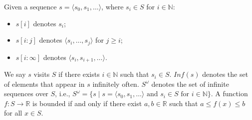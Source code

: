 Given a sequence \( s = \langle s_0, s_1, \dots \rangle \), where $s_i \in S$ for $i \in \mathbb{N}$:
\begin{itemize}
  \item \( s[i] \) denotes \( s_i \);
  \item \( s[i:j] \) denotes \( \langle s_i, \dots, s_j \rangle \) for \( j \geq i \);
  \item \( s[i:\infty] \) denotes \( \langle s_i, s_{i+1}, \dots \rangle \).
\end{itemize}
We say $s$ visits $S$ if there exists $i \in \mathbb{N}$ such that $s_i \in S$. $Inf(s)$ denotes the set of elements that appear in $s$ infinitely often. $S^{\omega}$ denotes the set of infinite sequences over $S$, i.e., $S^{\omega} = \{s \mid s=\langle s_0, s_1, \dots \rangle \text{ and } s_i \in S \text{ for } i \in \mathbb{N}\}$. A function $f: S \rightarrow \mathbb{R}$ is bounded if and only if there exist $a, b \in \mathbb{R}$ such that $a \leq f(x) \leq b$ for all $x \in S$.
